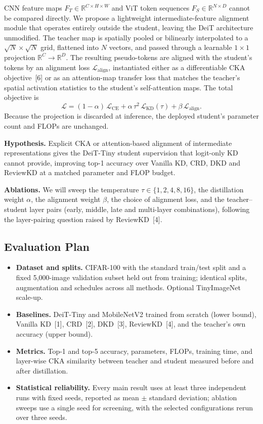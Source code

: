 \documentclass[11pt, letterpaper]{article}
\begin{document}
CNN feature maps $F_T \in \mathbb{R}^{C \times H \times W}$ and ViT token
sequences $F_S \in \mathbb{R}^{N \times D}$ cannot be compared directly. We
propose a lightweight intermediate-feature alignment module that operates
entirely outside the student, leaving the DeiT architecture unmodified. The
teacher map is spatially pooled or bilinearly interpolated to a $\sqrt{N} \times
\sqrt{N}$ grid, flattened into $N$ vectors, and passed through a learnable
$1\times1$ projection $\mathbb{R}^{C} \to \mathbb{R}^{D}$. The resulting
pseudo-tokens are aligned with the student's tokens by an alignment loss
$\mathcal{L}_{\text{align}}$, instantiated either as a differentiable CKA
objective~[6] or as an attention-map transfer loss that matches the teacher's
spatial activation statistics to the student's self-attention maps. The total
objective is
\[
\mathcal{L} = (1-\alpha)\,\mathcal{L}_{\text{CE}}
            + \alpha\,\tau^{2}\,\mathcal{L}_{\text{KD}}(\tau)
            + \beta\,\mathcal{L}_{\text{align}} .
\]
Because the projection is discarded at inference, the deployed student's
parameter count and FLOPs are unchanged.

\textbf{Hypothesis.} Explicit CKA or attention-based alignment of intermediate
representations gives the DeiT-Tiny student supervision that logit-only KD
cannot provide, improving top-1 accuracy over Vanilla KD, CRD, DKD and ReviewKD
at a matched parameter and FLOP budget.

\textbf{Ablations.} We will sweep the temperature $\tau \in \{1,2,4,8,16\}$, the
distillation weight $\alpha$, the alignment weight $\beta$, the choice of
alignment loss, and the teacher--student layer pairs (early, middle, late and
multi-layer combinations), following the layer-pairing question raised by
ReviewKD~[4].

\subsection{Evaluation Plan}

\begin{itemize}[noitemsep]
  \item \textbf{Dataset and splits.} CIFAR-100 with the standard train/test
        split and a fixed 5{,}000-image validation subset held out from training;
        identical splits, augmentation and schedules across all methods.
        Optional TinyImageNet scale-up.
  \item \textbf{Baselines.} DeiT-Tiny and MobileNetV2 trained from scratch
        (lower bound), Vanilla KD~[1], CRD~[2], DKD~[3], ReviewKD~[4], and the
        teacher's own accuracy (upper bound).
  \item \textbf{Metrics.} Top-1 and top-5 accuracy, parameters, FLOPs, training
        time, and layer-wise CKA similarity between teacher and student measured
        before and after distillation.
  \item \textbf{Statistical reliability.} Every main result uses at least three
        independent runs with fixed seeds, reported as mean $\pm$ standard
        deviation; ablation sweeps use a single seed for screening, with the
        selected configurations rerun over three seeds.
\end{itemize}
\end{document}
